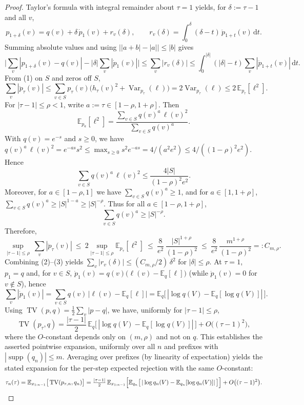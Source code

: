 \begin{proof}
Taylor's formula with integral remainder about $\tau=1$ yields, for $\delta:=\tau-1$ and all $v$,
\[
 p_{1+\delta}(v)=q(v)+\delta\,\dot{p}_{1}(v)+r_v(\delta),\qquad r_v(\delta)=\int_0^{\delta}(\delta-t)\,\ddot{p}_{1+t}(v)\,\mathrm dt.
\]
Summing absolute values and using $\big||a+b|-|a|\big|\le |b|$ gives
\begin{equation}\tag{2}
 \Big|\sum_v|p_{1+\delta}(v)-q(v)|-|\delta|\sum_v|\dot{p}_{1}(v)|\Big|\le\sum_v|r_v(\delta)|\le\int_0^{|\delta|}(|\delta|-t)\sum_v|\ddot{p}_{1+t}(v)|\,\mathrm dt.
\end{equation}
From (1) on $S$ and zeros off $S$,
\[
 \sum_v|\ddot{p}_{\tau}(v)|\le\sum_{v\in S} p_{\tau}(v)\big(h_{\tau}(v)^2+\operatorname{Var}_{p_{\tau}}(\ell)\big)=2\operatorname{Var}_{p_{\tau}}(\ell)\le 2\,\mathbb{E}_{p_{\tau}}[\ell^2].
\]
For $|\tau-1|\le\rho<1$, write $a:=\tau\in[1-\rho,1+\rho]$. Then
\[
 \mathbb{E}_{p_a}[\ell^2]=\frac{\sum_{v\in S} q(v)^a\,\ell(v)^2}{\sum_{v\in S} q(v)^a}.
\]
With $q(v)=e^{-s}$ and $s\ge 0$, we have $q(v)^a\,\ell(v)^2=e^{-a s}s^2\le\max_{s\ge0}s^2e^{-a s}=4/(a^2e^2)\le 4/((1-\rho)^2e^2)$. Hence
\[
 \sum_{v\in S} q(v)^a\,\ell(v)^2\le \frac{4|S|}{(1-\rho)^2e^2}.
\]
Moreover, for $a\in[1-\rho,1]$ we have $\sum_{v\in S} q(v)^a\ge 1$, and for $a\in[1,1+\rho]$, $\sum_{v\in S} q(v)^a\ge |S|^{1-a}\ge |S|^{-\rho}$. Thus for all $a\in[1-\rho,1+\rho]$,
\[
 \sum_{v\in S} q(v)^a\ge |S|^{-\rho}.
\]
Therefore,
\begin{equation}\tag{3}
 \sup_{|\tau-1|\le\rho}\ \sum_v|\ddot{p}_{\tau}(v)|\ \le\ 2\sup_{|\tau-1|\le\rho}\mathbb{E}_{p_{\tau}}[\ell^2]\ \le\ \frac{8}{e^2}\,\frac{|S|^{1+\rho}}{(1-\rho)^2}\ \le\ \frac{8}{e^2}\,\frac{m^{1+\rho}}{(1-\rho)^2}=:C_{m,\rho}.
\end{equation}
Combining (2)--(3) yields $\sum_v|r_v(\delta)|\le (C_{m,\rho}/2)\,\delta^2$ for $|\delta|\le\rho$. At $\tau=1$, $p_1=q$ and, for $v\in S$, $\dot{p}_1(v)=q(v)\big(\ell(v)-\mathbb{E}_q[\ell]\big)$ (while $\dot{p}_1(v)=0$ for $v\notin S$), hence
\[
 \sum_v|\dot{p}_1(v)|=\sum_{v\in S} q(v)\,\big|\ell(v)-\mathbb{E}_q[\ell]\big|=\mathbb{E}_q\big[\,|\log q(V)-\mathbb{E}_q[\log q(V)]|\,\big].
\]
Using $\operatorname{TV}(p,q)=\tfrac12\sum_v|p-q|$, we have, uniformly for $|\tau-1|\le\rho$,
\[
 \operatorname{TV}(p_{\tau},q)=\frac{|\tau-1|}{2}\,\mathbb{E}_q\big[\,|\log q(V)-\mathbb{E}_q[\log q(V)]|\,\big]+O\big((\tau-1)^2\big),
\]
where the $O$-constant depends only on $(m,\rho)$ and not on $q$. This establishes the asserted pointwise expansion, uniformly over all $n$ and prefixes with $|\operatorname{supp}(q_n)|\le m$. Averaging over prefixes (by linearity of expectation) yields the stated expansion for the per-step expected rejection with the same $O$-constant:
\[
 \tau_n(\tau)=\mathbb{E}_{x_{1:n-1}}\big[\operatorname{TV}(p_{\tau,n},q_n)\big]=\tfrac{|\tau-1|}{2}\,\mathbb{E}_{x_{1:n-1}}\Big[\mathbb{E}_{q_n}\big[\,|\log q_n(V)-\mathbb{E}_{q_n}[\log q_n(V)]|\,\big]\Big]+O\big((\tau-1)^2\big).\qedhere
\]
\end{proof}

